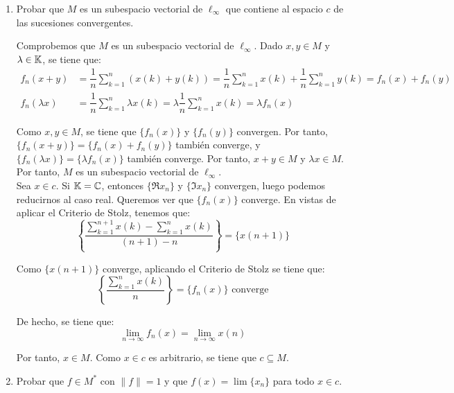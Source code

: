 \begin{ejercicio}
\begin{enumerate}
    Por tanto, $\|f_n\| \geq |f_n(x)| = 1$. En vistas de que anteriormente habíamos probado que $\|f_n\| \leq 1$, obtenemos que $\|f_n\| = 1$.
    \item Probar que $M$ es un subespacio vectorial de $\ell_\infty$ que contiene al espacio $c$ de las sucesiones convergentes.
    
    Comprobemos que $M$ es un subespacio vectorial de $\ell_\infty$. Dado $x, y \in M$ y $\lambda \in \mathbb{K}$, se tiene que:
    \begin{align*}
        f_n(x + y) &= \dfrac{1}{n} \sum_{k = 1}^n (x(k) + y(k)) = \dfrac{1}{n} \sum_{k = 1}^n x(k) + \dfrac{1}{n} \sum_{k = 1}^n y(k) = f_n(x) + f_n(y) \\
        f_n(\lambda x) &= \dfrac{1}{n} \sum_{k = 1}^n \lambda x(k) = \lambda \dfrac{1}{n} \sum_{k = 1}^n x(k) = \lambda f_n(x)
    \end{align*}

    Como $x, y \in M$, se tiene que $\{f_n(x)\}$ y $\{f_n(y)\}$ convergen. Por tanto, $\{f_n(x + y)\} = \{f_n(x) + f_n(y)\}$ también converge, y $\{f_n(\lambda x)\} = \{\lambda f_n(x)\}$ también converge. Por tanto, $x + y \in M$ y $\lambda x \in M$. Por tanto, $M$ es un subespacio vectorial de $\ell_\infty$.\\

    Sea $x \in c$. Si $\mathbb{K}=\mathbb{C}$, entonces $\{\Re x_n\}$ y $\{\Im x_n\}$ convergen, luego podemos reducirnos al caso real. Queremos ver que $\{f_n(x)\}$ converge. En vistas de aplicar el Criterio de Stolz, tenemos que:
    \begin{equation*}
        \left\{\dfrac{\sum\limits_{k = 1}^{n+1} x(k) - \sum\limits_{k = 1}^n x(k)}{(n + 1) - n}\right\} = \{x(n + 1)\}
    \end{equation*}

    Como $\{x(n + 1)\}$ converge, aplicando el Criterio de Stolz se tiene que:
    \begin{equation*}
        \left\{\dfrac{\sum\limits_{k = 1}^n x(k)}{n}\right\} = \{f_n(x)\} \text{ converge}
    \end{equation*}

    De hecho, se tiene que:
    \begin{equation*}
        \lim_{n \to \infty} f_n(x) = \lim_{n \to \infty} x(n)
    \end{equation*}

    Por tanto, $x \in M$. Como $x \in c$ es arbitrario, se tiene que $c \subseteq M$.

    \item Probar que $f \in M^*$ con $\|f\| = 1$ y que $f(x) = \lim \{x_n\}$ para todo $x \in c$.
    

\end{enumerate}
\end{ejercicio}
